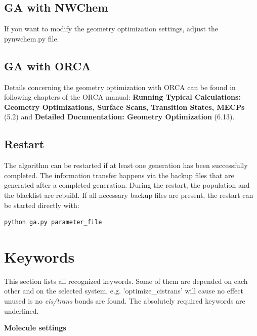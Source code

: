 \documentclass[a4paper]{article}
\begin{document}
\subsection{GA with NWChem}
If you want to modify the geometry optimization settings, adjust the pynwchem.py file. 
\subsection{GA with ORCA} 
Details concerning the geometry optimization with ORCA can be found in following chapters of the ORCA manual: \textbf{Running Typical Calculations: Geometry Optimizations, Surface Scans, Transition States, MECPs} (5.2) and \textbf{Detailed Documentation: Geometry Optimization} (6.13).

\subsection{Restart}
The algorithm can be restarted if at least one generation has been successfully completed. The information transfer happens via the backup files that are generated after a completed generation. During the restart, the population and the blacklist are rebuild. If all necessary backup files are present, the restart can be started directly with:

\begin{verbatim}
python ga.py parameter_file
\end{verbatim}





\section{Keywords}

This section lists all recognized keywords. Some of them are depended on each other and on the selected system, e.g. 'optimize\_cistrans' will cause no effect unused is no \textit{cis/trans} bonds are found. The absolutely required keywords are underlined. 
\vspace{10pt}

\noindent
\textbf{\large{Molecule settings}}
\end{document}
